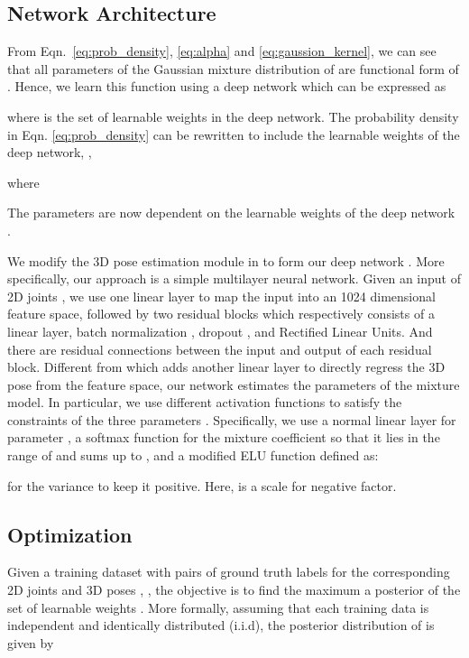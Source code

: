 \documentclass[10pt,twocolumn,letterpaper]{article}
\begin{document}
\subsection{Network Architecture}
From Eqn.~\eqref{eq:prob_density}, \eqref{eq:alpha} and \eqref{eq:gaussion_kernel}, we can see that all parameters  of the Gaussian mixture distribution of  are functional form of . Hence, we learn this function  using a deep network which can be expressed as

\noindent where  is the set of learnable weights in the deep network. The 
probability density in Eqn. \eqref{eq:prob_density} can be rewritten to include the learnable weights  of the deep network, \ie, 

\noindent where


\noindent The parameters  are now dependent on the learnable weights  of the deep network .

We modify the 3D pose estimation module in \cite{martinez2017simple} to form our deep network .
More specifically, our approach is a simple multilayer neural network. Given an input of 2D joints , we use one linear layer to map the input into an 1024 dimensional feature space, followed by two residual blocks which respectively consists of a linear layer, batch normalization , dropout , and Rectified Linear Units. And there are residual connections between the input and output of each residual block. Different from \cite{martinez2017simple} which adds another linear layer to directly regress the 3D pose  from the feature space, our network estimates the parameters  of the mixture model. In particular, we use different activation functions to satisfy the constraints of the three parameters  . Specifically, we use a normal linear layer for parameter , a softmax function for the mixture coefficient  so that it lies in the range of  and sums up to , and a modified ELU function \cite{clevert2015fast} defined as:


for the variance  to keep it positive. Here,  is a scale for negative factor.

\subsection{Optimization}
 Given a training dataset with  pairs of ground truth labels for the corresponding 2D joints  and 3D poses , \ie , the objective is to find the maximum a posterior of the set of learnable weights . More formally, assuming that each training data is independent and identically distributed (i.i.d), the posterior distribution of  is given by
 
\end{document}
